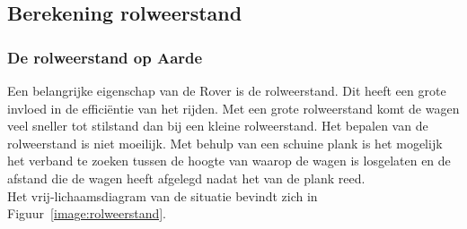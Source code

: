 \subsection{Berekening rolweerstand}
\label{bijlage:rolweerstand}
\subsubsection{De rolweerstand op Aarde}

Een belangrijke eigenschap van de Rover is de rolweerstand. Dit heeft een grote invloed in de effici\"entie van het rijden. Met een grote rolweerstand komt de wagen veel sneller tot stilstand dan bij een kleine rolweerstand. Het bepalen van de rolweerstand is niet moeilijk. Met behulp van een schuine plank is het mogelijk het verband te zoeken tussen de hoogte van waarop de wagen is losgelaten en de afstand die de wagen heeft afgelegd nadat het van de plank reed.\\
Het vrij-lichaamsdiagram van de situatie bevindt zich in Figuur~\ref{image:rolweerstand}.

